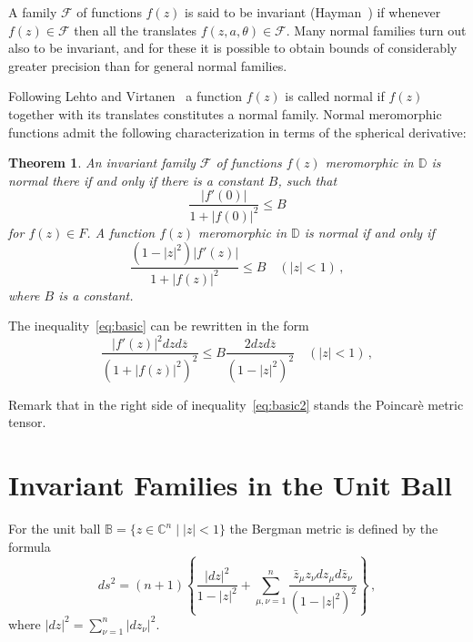 \documentclass[pdflatex]{sn-jnl}%
\newtheorem{thm}{Theorem}[section]
\theoremstyle{definition}
\theoremstyle{remark}
\numberwithin{equation}{section}
\newcommand{\Cn}{\mathbb{C}^n}
\newcommand{\D}{\mathbb{D}}
\begin{document}
    A family $\mathcal{F}$ of functions $f(z)$ is said to be invariant (Hayman~\cite{MR0070716}) if whenever $f(z) \in \mathcal{F}$ then all the translates $f(z, a, \theta) \in \mathcal{F}$.
    Many normal families turn out also to be invariant, and for these it is possible to obtain bounds of considerably greater precision than for general normal families.

    Following Lehto and Virtanen~\cite{MR0087746} a function $f(z)$ is called normal if $f(z)$ together with its translates constitutes a normal family.
    Normal meromorphic functions admit the following characterization in terms of the spherical derivative:

    \begin{thm}
        \label{thm:criterion-norm}
        An invariant family $\mathcal{F}$ of functions $f(z)$ meromorphic in $\D$ is normal there if and only if there is a constant $B$, such that
        \[
            \frac{|f'(0)|}{1+|f(0)|^2}\leqslant B
        \]
        for $f(z) \in F$.
        A function $f(z)$ meromorphic in $\D$ is normal if and only if
        \begin{equation}
            \frac{\left(1-|z|^2\right)|f'(z)|}{1+|f(z)|^2}\leqslant B \quad(|z|<1)\,,
            \label{eq:basic}
        \end{equation}
        where $B$ is a constant.
    \end{thm}

    The inequality~\eqref{eq:basic} can be rewritten in the form
    \begin{equation}
        \frac{|f'(z)|^2 dzd\overline{z}}{\left(1+|f(z)|^2\right)^2}\leqslant B\frac{2dzd\overline{z}}{\left(1-|z|^2\right)^2}\quad(|z|<1)\,,
        \label{eq:basic2}
    \end{equation}

    Remark that in the right side of inequality~\eqref{eq:basic2} stands the Poincar\`{e} metric tensor.

    \section{Invariant Families in the Unit Ball}

    For the unit ball $\mathbb{B}=\{z\in \Cn \mid |z|<1\}$ the Bergman metric is defined by the formula
    \[
        d s^2=(n+1)\left\{\frac{|d z|^2}{1-|z|^2}+\sum_{\mu, \nu=1}^n \frac{\bar{z}_\mu z_\nu d z_\mu d \bar{z}_\nu}{\left(1-|z|^2\right)^2}\right\}\,,
    \]
    where $|d z|^2=\sum_{\nu=1}^n|d z_\nu|^2$.
\end{document}

